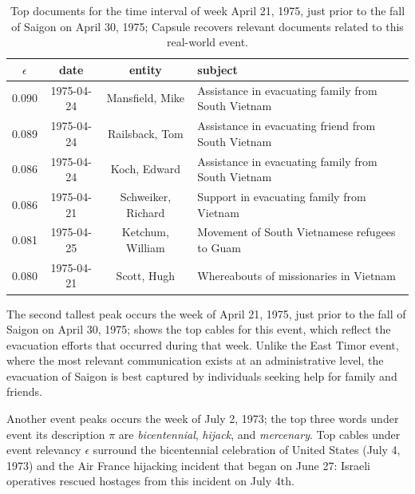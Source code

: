 \begin{table}[htb]
\small
\centering
\begin{tabular}{cccl}
\toprule
$\epsilon$ & date & entity & subject \\
\midrule
0.090   &  1975-04-24  &  Mansfield, Mike & Assistance in evacuating family from South Vietnam \\
0.089   &  1975-04-24  &  Railsback, Tom & Assistance in evacuating friend from South Vietnam \\
0.086   &  1975-04-24  &  Koch, Edward & Assistance in evacuating family from South Vietnam \\
0.086   &  1975-04-21  &  Schweiker, Richard & Support in evacuating family from Vietnam \\
0.081   &  1975-04-25  &  Ketchum, William & Movement of South Vietnamese refugees to Guam \\
0.080   &  1975-04-21  &  Scott, Hugh & Whereabouts of missionaries in Vietnam \\
\bottomrule
\end{tabular}
\label{tab:saigon}
\caption{Top documents for the time interval of week April 21, 1975, just prior to the fall of Saigon on April 30, 1975; Capsule recovers relevant documents related to this real-world event.}
\end{table}

The second tallest peak occurs the week of April 21, 1975, just prior to the fall of Saigon on April 30, 1975;  shows the top cables for this event, which reflect the evacuation efforts that occurred during that week.  Unlike the East Timor event, where the most relevant communication exists at an administrative level, the evacuation of Saigon is best captured by individuals seeking help for family and friends.

Another event peaks occurs the week of July 2, 1973; the top three words under event its description $\pi$ are \emph{bicentennial}, \emph{hijack}, and \emph{mercenary}.  Top cables under event relevancy $\epsilon$ surround the bicentennial celebration of United States (July 4, 1973) and the Air France hijacking incident that began on June 27: Israeli operatives rescued hostages from this incident on July 4th.

